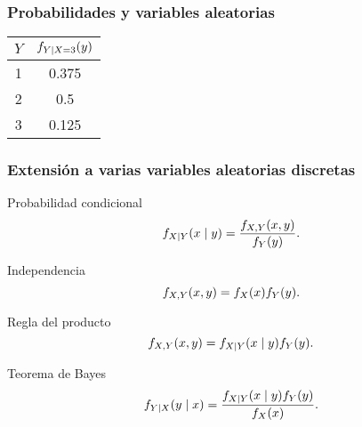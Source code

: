 \documentclass[table]{beamer}
\begin{document}
\begin{frame}
    \frametitle{Probabilidades y variables aleatorias}
    
    \begin{center}
        \begin{tabular}{c|c}
            $Y$ & $\pff{Y \mid X = 3}{y}$ \\
            \hline
            1 & 0.375 \\
            2 & 0.5 \\
            3 & 0.125
        \end{tabular}
    \end{center}
\end{frame}


\begin{frame}
    \frametitle{Extensión a varias variables aleatorias discretas}
    \begin{block}{Probabilidad condicional}
        \begin{equation*}
            \pff{X \mid Y}{x \mid y} = \frac{\pff{X, Y}{x, y}}{\pff{Y}{y}} .
        \end{equation*}
    \end{block}
    \begin{block}{Independencia}
        \begin{equation*}
            \pff{X, Y}{x, y} = \pff{X}{x} \pff{Y}{y} .
        \end{equation*}
    \end{block}
    \begin{block}{Regla del producto}
        \begin{equation*}
            \pff{X, Y}{x, y} = \pff{X \mid Y}{x \mid y} \pff{Y}{y} .
        \end{equation*}
    \end{block}
    \begin{block}{Teorema de Bayes}
        \begin{equation*}
            \pff{Y \mid X}{y \mid x} = \frac{\pff{X \mid Y}{x \mid y} \pff{Y}{y}}{\pff{X}{x}} .
        \end{equation*}
    \end{block}
\end{frame}
\end{document}
